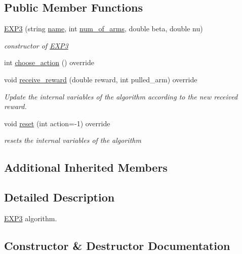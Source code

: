 \subsection*{Public Member Functions}
\begin{DoxyCompactItemize}
\item 
\mbox{\hyperlink{class_e_x_p3_adb52da022d3f30abb0784cfd63104231}{E\+X\+P3}} (string \mbox{\hyperlink{class_m_a_b_algorithm_a77b10ecc4b49d519c557f65358167b82}{name}}, int \mbox{\hyperlink{class_m_a_b_algorithm_a340fa9e83e85b092f2c6125fc4e8549b}{num\+\_\+of\+\_\+arms}}, double beta, double nu)
\begin{DoxyCompactList}\small\item\em constructor of \mbox{\hyperlink{class_e_x_p3}{E\+X\+P3}} \end{DoxyCompactList}\item 
int \mbox{\hyperlink{class_e_x_p3_adb52fc51fbc5ef97e3d67c2437634be8}{choose\+\_\+action}} () override
\item 
void \mbox{\hyperlink{class_e_x_p3_a9408f963aa533ffb298deba2fbc65529}{receive\+\_\+reward}} (double reward, int pulled\+\_\+arm) override
\begin{DoxyCompactList}\small\item\em Update the internal variables of the algorithm according to the new received reward. \end{DoxyCompactList}\item 
void \mbox{\hyperlink{class_e_x_p3_a30530aa50cd991eda2f9f2f170b92d0e}{reset}} (int action=-\/1) override
\begin{DoxyCompactList}\small\item\em resets the internal variables of the algorithm \end{DoxyCompactList}\end{DoxyCompactItemize}
\subsection*{Additional Inherited Members}


\subsection{Detailed Description}
\mbox{\hyperlink{class_e_x_p3}{E\+X\+P3}} algorithm. 

\subsection{Constructor \& Destructor Documentation}
\mbox{\label{class_e_x_p3_adb52da022d3f30abb0784cfd63104231}} 
